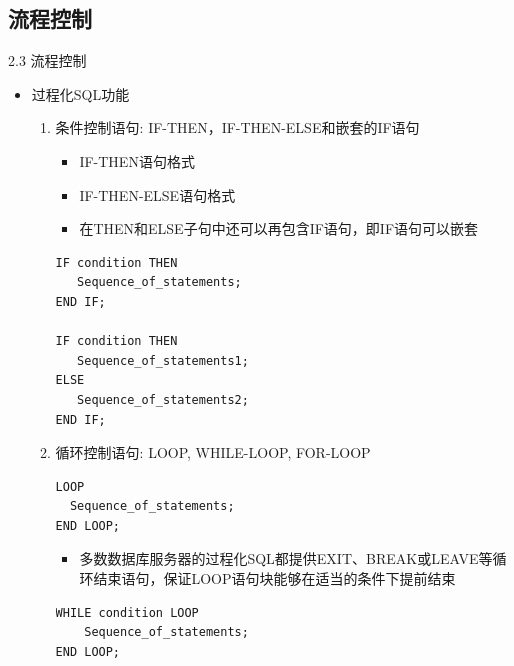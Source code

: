 \subsection{流程控制}
\begin{frame}{2.3 流程控制}
\begin{itemize}
    \item 过程化SQL功能
    \begin{enumerate}
        \item 条件控制语句: IF-THEN，IF-THEN-ELSE和嵌套的IF语句 
        \begin{itemize}
            \item IF-THEN语句格式
            \item IF-THEN-ELSE语句格式
            \item 在THEN和ELSE子句中还可以再包含IF语句，即IF语句可以嵌套
        \end{itemize}
\begin{block}{}
\begin{lstlisting}
IF condition THEN
   Sequence_of_statements;        
END IF;   

IF condition THEN
   Sequence_of_statements1;  
ELSE
   Sequence_of_statements2;  
END IF;
\end{lstlisting}
\end{block} 
        
        \framebreak
        
        \item 循环控制语句: LOOP, WHILE-LOOP, FOR-LOOP

\begin{block}{}
\begin{lstlisting}
LOOP
  Sequence_of_statements;        
END LOOP;
\end{lstlisting}
\end{block} 
        \begin{itemize}
            \item 多数数据库服务器的过程化SQL都提供EXIT、BREAK或LEAVE等循环结束语句，保证LOOP语句块能够在适当的条件下提前结束
        \end{itemize}
\framebreak
\begin{block}{}
\begin{lstlisting}
WHILE condition LOOP
    Sequence_of_statements;
END LOOP;

\end{lstlisting}
\end{block} 


\end{enumerate}
\end{itemize}
\end{frame}
